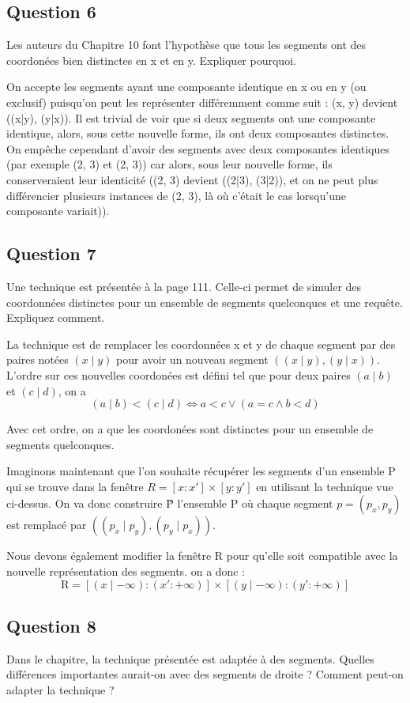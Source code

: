 \documentclass{article}
\newcommand{\gray}{\color{gray}}
\newcommand{\black}{\color{black}}
\begin{document}
\black

\newpage

\subsection{Question 6} Les auteurs du Chapitre 10 font l'hypothèse que tous les segments ont des coordonées bien
distinctes en x et en y. Expliquer pourquoi.


\bigskip

\gray
On accepte les segments ayant une composante identique en x ou en y (ou exclusif) puisqu'on peut les représenter différemment comme suit : (x, y) devient ((x|y), (y|x)).
Il est trivial de voir que si deux segments ont une composante identique, alors, sous cette nouvelle forme, ils ont deux composantes distinctes.
On empêche cependant d'avoir des segments avec deux composantes identiques (par exemple (2, 3) et (2, 3))
car alors, sous leur nouvelle forme, ils conserveraient leur identicité ((2, 3) devient ((2|3), (3|2)), et on ne peut plus différencier plusieurs instances de (2, 3), 
là où c'était le cas lorsqu'une composante variait)).
\black


\subsection{Question 7} Une technique est présentée à la page 111. Celle-ci permet de simuler des coordonnées
distinctes pour un ensemble de segments quelconques et une requête. Expliquez comment.


\bigskip

La technique est de remplacer les coordonnées x et y de chaque segment par des paires notées $(x \mid y)$ pour avoir un nouveau segment $((x \mid y), (y \mid x))$.
L'ordre sur ces nouvelles coordonées est défini tel que pour deux paires $(a \mid b)$ et $(c \mid d)$, on a 
\[
    (a \mid b) < (c \mid d) \iff a < c \lor (a = c \land b < d)  
\]

Avec cet ordre, on a que les coordonées sont distinctes pour un ensemble de segments quelconques.

\medskip
Imaginons maintenant que l'on souhaite récupérer les segments d'un ensemble P qui se trouve dans la fenêtre $R = [x:x'] \times [y:y']$
en utilisant la technique vue ci-dessus. On va donc construire \^P l'ensemble P où chaque segment $p = (p_x,p_y)$ est remplacé par $((p_x \mid p_y), (p_y \mid p_x))$.

Nous devons également modifier la fenêtre R pour qu'elle soit compatible avec la nouvelle représentation des segments.
on a donc :
\[
    \text{\^R} = [(x \mid - \infty) : (x':+\infty)] \times [(y \mid - \infty) : (y':+\infty)]   
\]


\subsection{Question 8} Dans le chapitre, la technique présentée est adaptée à des segments.
Quelles différences importantes aurait-on avec des segments de droite ? Comment peut-on adapter la technique ?

\bigskip
\end{document}
